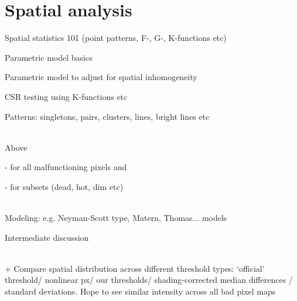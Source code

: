 \documentclass[../../IO-Pixels.tex]{subfiles}
\begin{document}
\section{Spatial analysis}
\begin{outline}
Spatial statistics 101 (point patterns, F-, G-, K-functions etc)

Parametric model basics

Parametric model to adjust for spatial inhomogeneity

CSR testing using K-functions etc

Patterns: singletons, pairs, clusters, lines, bright lines etc

\\
Above 

- for all malfunctioning pixels and 

- for subsets (dead, hot, dim etc)

\\
Modeling: e.g. Neyman-Scott type, Matern, Thomas... models

Intermediate discussion

\\
+ Compare spatial distribution across different threshold types: `official' threshold/ nonlinear px/ our thresholds/ shading-corrected median differences / standard deviations. Hope to see similar intensity across all bad pixel maps
\end{outline}

\end{document}
